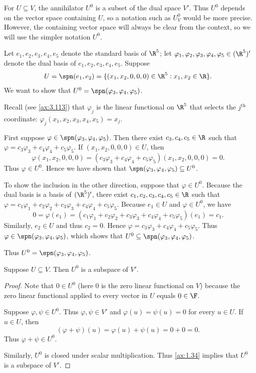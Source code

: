 For $U\subseteq V$, the annihilator $U^0$ is a subset of the dual space $V'$.
Thus $U^0$ depends on the vector space containing $U$, so a notation such as
$U_V^0$ would be more precise. However, the containing vector space will always
be clear from the context, so we will use the simpler notation $U^0$.

\begin{example}\label{ax:3.123}
Let $e_1,e_2,e_3,e_4,e_5$ denote the standard basis of $\R^5$; let
$\varphi_1,\varphi_2,\varphi_3,\varphi_4,\varphi_5\in(\R^5)'$ denote the dual
basis of $e_1,e_2,e_3,e_4,e_5$. Suppose
\[ U = \spn(e_1,e_2) = \{(x_1,x_2,0,0,0)\in\R^5 : x_1,x_2\in\R\}. \]
We want to show that $U^0=\spn(\varphi_3,\varphi_4,\varphi_5)$.

Recall (see \ref{ax:3.113}) that $\varphi_j$ is the linear functional on $\R^5$
that selects the $j^{\text{th}}$ coordinate:
$\varphi_j(x_1,x_2,x_3,x_4,x_5)=x_j$.

First suppose $\varphi\in\spn(\varphi_3,\varphi_4,\varphi_5)$. Then there exist
$c_3,c_4,c_5\in\R$ such that $\varphi=c_3\varphi_3+c_4\varphi_4+c_5\varphi_5$.
If $(x_1,x_2,0,0,0)\in U$, then
\[ \varphi(x_1,x_2,0,0,0)
   = (c_3\varphi_3+c_4\varphi_4+c_5\varphi_5)(x_1,x_2,0,0,0) = 0. \]
Thus $\varphi\in U^0$. Hence we have shown that
$\spn(\varphi_3,\varphi_4,\varphi_5)\subseteq U^0$.

To show the inclusion in the other direction, suppose that $\varphi\in U^0$.
Because the dual basis is a basis of $(\R^5)'$, there exist
$c_1,c_2,c_3,c_4,c_5\in\R$ such that
$\varphi=c_1\varphi_1+c_2\varphi_2+c_3\varphi_3+c_4\varphi_4+c_5\varphi_5$.
Because $e_1\in U$ and $\varphi\in U^0$, we have
\[ 0 = \varphi(e_1)
   = (c_1\varphi_1+c_2\varphi_2+c_3\varphi_3+c_4\varphi_4+c_5\varphi_5)(e_1)
   = c_1. \]
Similarly, $e_2\in U$ and thus $c_2=0$. Hence
$\varphi=c_3\varphi_3+c_4\varphi_4+c_5\varphi_5$. Thus
$\varphi\in\spn(\varphi_3,\varphi_4,\varphi_5)$, which shows that
$U^0\subseteq\spn(\varphi_3,\varphi_4,\varphi_5)$.

Thus $U^0=\spn(\varphi_3,\varphi_4,\varphi_5)$.
\end{example}

\begin{result}\label{ax:3.124}
Suppose $U\subseteq V$. Then $U^0$ is a subspace of $V'$.
\end{result}

\begin{proof}
Note that $0\in U^0$ (here $0$ is the zero linear functional on $V$) because the
zero linear functional applied to every vector in $U$ equals $0\in\F$.

Suppose $\varphi,\psi\in U^0$. Thus $\varphi,\psi\in V'$ and
$\varphi(u)=\psi(u)=0$ for every $u\in U$. If $u\in U$, then
\[ (\varphi+\psi)(u) = \varphi(u)+\psi(u) = 0+0 = 0. \]
Thus $\varphi+\psi\in U^0$.

Similarly, $U^0$ is closed under scalar multiplication. Thus \ref{ax:1.34}
implies that $U^0$ is a subspace of $V'$.
\end{proof}

